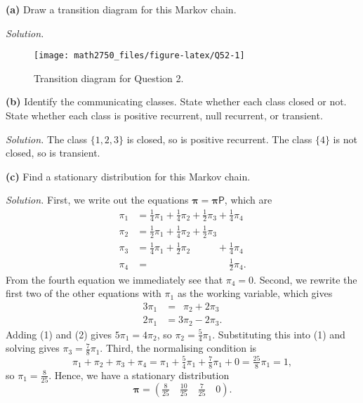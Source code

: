 \documentclass[
  a4paper,
]{article}
\theoremstyle{definition}
\theoremstyle{definition}
\theoremstyle{definition}
\theoremstyle{remark}
\begin{document}
\textbf{(a)} Draw a transition diagram for this Markov chain.

\begin{myanswers}

\emph{Solution.}

\begin{figure}

{\centering \texttt{[image: math2750\_files/figure-latex/Q52-1]} 

}

\caption{Transition diagram for Question 2.}\label{fig:Q52}
\end{figure}

\end{myanswers}

\textbf{(b)} Identify the communicating classes. State whether each class closed or not. State whether each class is positive recurrent, null recurrent, or transient.

\begin{myanswers}

\emph{Solution.} The class \(\{1,2,3\}\) is closed, so is positive recurrent. The class \(\{4\}\) is not closed, so is transient.

\end{myanswers}

\textbf{(c)} Find a stationary distribution for this Markov chain.

\begin{myanswers}

\emph{Solution.} First, we write out the equations \(\boldsymbol\pi = \boldsymbol\pi\mathsf P\), which are
\begin{align*}
\pi_1 &= \tfrac14\pi_1 + \tfrac14\pi_2 + \tfrac12\pi_3 + \tfrac14\pi_4 \\
\pi_2 &= \tfrac12\pi_1 + \tfrac14\pi_2 + \tfrac12\pi_3 \\
\pi_3 &= \tfrac14\pi_1 + \tfrac12\pi_2 \phantom{{}+\tfrac12\pi_3} + \tfrac14\pi_4 \\
\pi_4 &= \phantom{\tfrac12\pi_1 + \tfrac14\pi_2 + \tfrac12\pi_3+{}}  \tfrac12 \pi_4 .
\end{align*}
From the fourth equation we immediately see that \(\pi_4 = 0\). Second, we rewrite the first two of the other equations with \(\pi_1\) as the working variable, which gives
\begin{align}
3\pi_1 &= \phantom{3}\pi_2 + 2\pi_3 \tag{1} \\
2\pi_1 &= 3\pi_2 - 2\pi_3 \tag{2} .
\end{align}
Adding (1) and (2) gives \(5\pi_1 = 4\pi_2\), so \(\pi_2 = \frac54\pi_1\). Substituting this into (1) and solving gives \(\pi_3 = \frac78 \pi_1\). Third, the normalising condition is
\[ \pi_1 + \pi_2 + \pi_3 + \pi_4 = \pi_1 + \tfrac54\pi_1 + \tfrac78\pi_1 + 0 = \tfrac{25}{8}\pi_1 = 1, \]
so \(\pi_1 = \frac{8}{25}\). Hence, we have a stationary distribution
\[ \boldsymbol\pi = \left(\tfrac{8}{25} \quad \tfrac{10}{25} \quad \tfrac{7}{25} \quad 0 \right) .\]

\end{myanswers}
\end{document}
